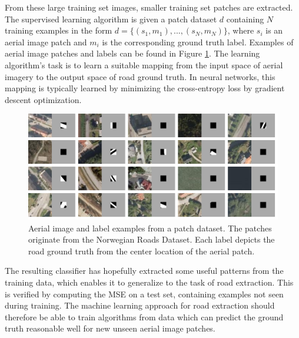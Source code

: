 From these large training set images, smaller training set patches are extracted. The supervised learning algorithm is given a patch dataset $d$ containing $N$ training examples in the form $d=\{(s_1, m_1),...,(s_N, m_N)\}$, where $s_i$ is an aerial image patch and $m_i$ is the corresponding ground truth label. Examples of aerial image patches and labels can be found in Figure \ref{fig:examples_background}. The learning algorithm's task is to learn a suitable mapping from the input space of aerial imagery to the output space of road ground truth. In neural networks, this mapping is typically learned by minimizing the cross-entropy loss by gradient descent optimization.\\

\begin{figure}
\begin{center}
\includegraphics[width=1\columnwidth]{figs/examples.png}
\caption[Patch dataset examples]{Aerial image and label examples from a patch dataset. The patches originate from the Norwegian Roads Dataset. Each label depicts the road ground truth from the center location of the aerial patch.}
\label{fig:examples_background}
\end{center}
\end{figure}

 The resulting classifier has hopefully extracted some useful patterns from the training data, which enables it to generalize to the task of road extraction. This is verified by computing the \ac{MSE} on a test set, containing examples not seen during training. The machine learning approach for road extraction should therefore be able to train algorithms from data which can predict the ground truth reasonable well for new unseen aerial image patches. \\

